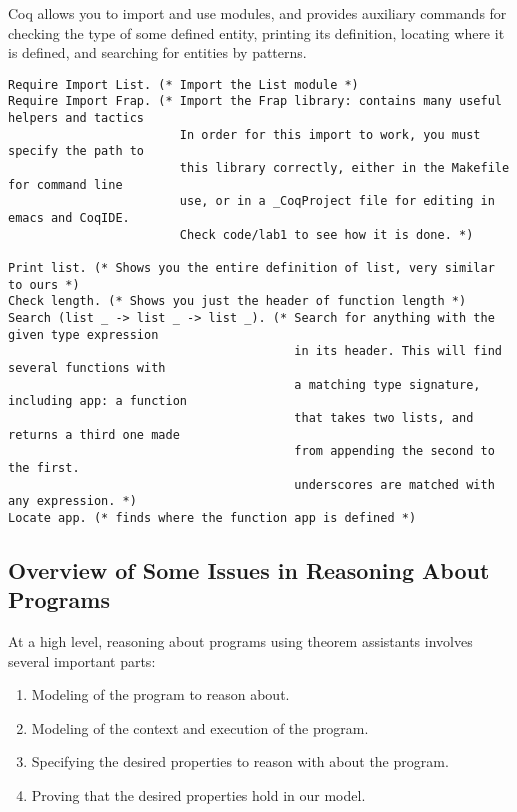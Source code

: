 \documentclass{article}
\begin{document}
Coq allows you to import and use modules, and provides auxiliary commands for checking the type of some defined entity, printing its definition,
locating where it is defined, and searching for entities by patterns.

\begin{verbatim}
Require Import List. (* Import the List module *)
Require Import Frap. (* Import the Frap library: contains many useful helpers and tactics
                        In order for this import to work, you must specify the path to
                        this library correctly, either in the Makefile for command line
                        use, or in a _CoqProject file for editing in emacs and CoqIDE.
                        Check code/lab1 to see how it is done. *)

Print list. (* Shows you the entire definition of list, very similar to ours *)
Check length. (* Shows you just the header of function length *)
Search (list _ -> list _ -> list _). (* Search for anything with the given type expression 
                                        in its header. This will find several functions with 
                                        a matching type signature, including app: a function
                                        that takes two lists, and returns a third one made
                                        from appending the second to the first.
                                        underscores are matched with any expression. *)
Locate app. (* finds where the function app is defined *)
\end{verbatim}

\subsection{Overview of Some Issues in Reasoning About Programs}

At a high level, reasoning about programs using theorem assistants involves several important parts:
\begin{enumerate}
    \item Modeling of the program to reason about.
    \item Modeling of the context and execution of the program.
    \item Specifying the desired properties to reason with about the program.
    \item Proving that the desired properties hold in our model.
\end{enumerate}
\end{document}
